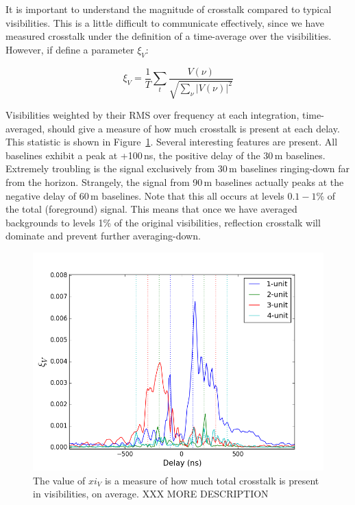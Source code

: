 \documentclass[10pt,a4paper,notitlepage]{article}
\begin{document}
It is important to understand the magnitude of crosstalk compared to typical visibilities. This is a little difficult to communicate effectively, since we have measured crosstalk under the definition of a time-average over the visibilities. However, if define a parameter $\xi_V$: 

\begin{equation}
\xi_V=\frac{1}{T}\sum_t\frac{V(\nu)}{\sqrt{\sum_\nu|V(\nu)|^2}}
\end{equation}

Visibilities weighted by their RMS over frequency at each integration, time-averaged, should give a measure of how much crosstalk is present at each delay. This statistic is shown in Figure~\ref{fig:xi_V}. Several interesting features are present. All baselines exhibit a peak at +100\,ns, the positive delay of the 30\,m baselines. Extremely troubling is the signal exclusively from 30\,m baselines ringing-down far from the horizon.  Strangely, the signal from 90\,m baselines actually peaks at the negative delay of 60\,m baselines. Note that this all occurs at levels $0.1-1\%$ of the total (foreground) signal. This means that once we have averaged backgrounds to levels 1\% of the original visibilities, reflection crosstalk will dominate and prevent further averaging-down.


\begin{figure}
\centering
\includegraphics[scale=0.5]{xi_V.png}
\caption{The value of $xi_V$ is a measure of how much total crosstalk is present in visibilities, on average. XXX MORE DESCRIPTION}
\label{fig:xi_V}
\end{figure}
\end{document}
